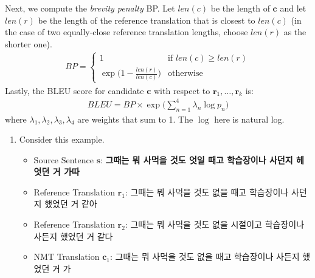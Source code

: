 \documentclass{assignment format}
\begin{document}
\begin{enumerate}[label=(\alph*)]
    Next, we compute the \textit{brevity penalty} BP. Let $len(c)$ be the length of $\mathbf{c}$ and let $len(r)$ be the length of the reference translation that is closest to $len(c)$ (in the case of two equally-close reference translation lengths, choose $len(r)$ as the shorter one). 
    \begin{align}
        BP = 
        \begin{cases}
            1 & \text{if } len(c) \ge len(r) \\
            \exp \big( 1 - \frac{len(r)}{len(c)} \big) & \text{otherwise}
        \end{cases}
    \end{align}
    Lastly, the BLEU score for candidate $\mathbf{c}$ with respect to $\mathbf{r}_1,\dots,\mathbf{r}_k$ is:
    \begin{align}
        BLEU = BP \times \exp \Big( \sum_{n=1}^4 \lambda_n \log p_n \Big)
    \end{align}
    where $\lambda_1,\lambda_2,\lambda_3,\lambda_4$ are weights that sum to 1. The $\log$ here is natural log.
    \newline
    \begin{enumerate}[label=(\roman*)]
        \item Consider this example.
        \begin{itemize}
\item        Source Sentence $\mathbf{s}$: \textbf{그때는 뭐 사먹을 것도 엇일 때고 학습장이나 사던지 헤엇던 거 가따} 
      \item  Reference Translation $\mathbf{r}_1$: 그때는 뭐 사먹을 것도 없을 때고 학습장이나 사던지 했었던 거 같아 
        \item Reference Translation $\mathbf{r}_2$: 그때는 뭐 사먹을 것도 없을 시절이고 학습장이나 사든지 했었던 거 같다 
        \item NMT Translation $\mathbf{c}_1$: 그때는 뭐 사먹을 것도 없을 때고 학습장이나 사든지 했었던 거 가
    \end{itemize}


\end{enumerate}
\end{enumerate}
\end{document}
